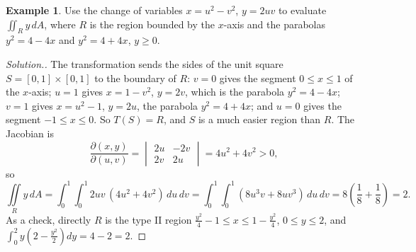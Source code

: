 \documentclass[11pt,a4paper]{article}
\theoremstyle{definition}
\newtheorem{exa}[thm]{Example}
\newenvironment{solution}
  {\renewcommand{\qedsymbol}{}\begin{proof}[\textit{Solution}.]}
  {\end{proof}}
\begin{document}
\begin{exa}
\label{ex:changeparabolas}
Use the change of variables $x = u^2 - v^2$, $y = 2uv$ to evaluate
$\iint_R y\,dA$, where $R$ is the region bounded by the $x$-axis and the
parabolas $y^2 = 4 - 4x$ and $y^2 = 4 + 4x$, $y\geq 0$.

\begin{figure}[H]
\centering
{}
\end{figure}
\end{exa}

\begin{solution}
The transformation sends the sides of the unit square $S = [0,1]\times[0,1]$ to
the boundary of $R$: $v = 0$ gives the segment $0\leq x\leq 1$ of the $x$-axis;
$u = 1$ gives $x = 1 - v^2$, $y = 2v$, which is the parabola $y^2 = 4 - 4x$;
$v = 1$ gives $x = u^2 - 1$, $y = 2u$, the parabola $y^2 = 4 + 4x$; and $u = 0$
gives the segment $-1\leq x\leq 0$. So $T(S) = R$, and $S$ is a much easier
region than $R$. The Jacobian is
\[\frac{\partial(x,y)}{\partial(u,v)} = \begin{vmatrix} 2u & -2v\\ 2v &
2u\end{vmatrix} = 4u^2 + 4v^2 >0 ,\]
so
\[\iint\limits_R y\,dA = \int^1_0\int^1_0 2uv\,(4u^2 + 4v^2)\,du\,dv =
\int^1_0\int^1_0 (8u^3v + 8uv^3)\,du\,dv = 8\left(\frac18 + \frac18\right) = 2 .\]
As a check, directly $R$ is the type II region
$\frac{y^2}{4} - 1\leq x\leq 1 - \frac{y^2}{4}$, $0\leq y\leq 2$, and
$\int_0^2 y\left(2 - \frac{y^2}{2}\right)dy = 4 - 2 = 2$.
\end{solution}
\end{document}
